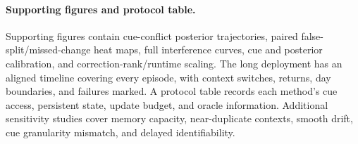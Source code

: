 \paragraph{Supporting figures and protocol table.}
Supporting figures contain cue-conflict posterior trajectories, paired false-split/missed-change heat maps, full interference curves, cue and posterior calibration, and correction-rank/runtime scaling. The long deployment has an aligned timeline covering every episode, with context switches, returns, day boundaries, and failures marked. A protocol table records each method's cue access, persistent state, update budget, and oracle information. Additional sensitivity studies cover memory capacity, near-duplicate contexts, smooth drift, cue granularity mismatch, and delayed identifiability.
